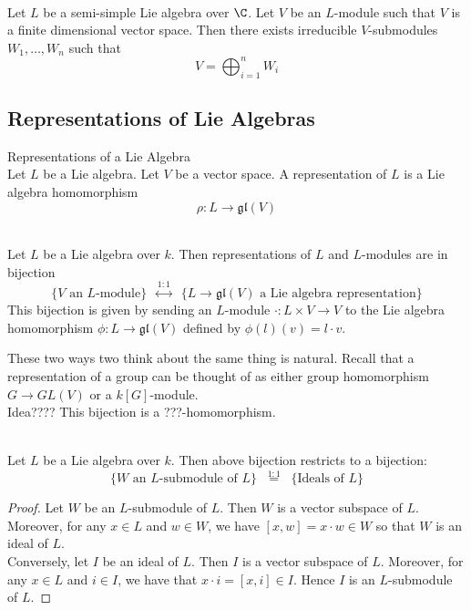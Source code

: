 \documentclass[a4paper]{article}
\begin{document}
\begin{crl}{}{} \\Let $L$ be a semi-simple Lie algebra over $\C$. Let $V$ be an $L$-module such that $V$ is a finite dimensional vector space. Then there exists irreducible $V$-submodules $W_1,\dots,W_n$ such that $$V=\bigoplus_{i=1}^nW_i$$
\end{crl}

\subsection{Representations of Lie Algebras}
\begin{defn}{Representations of a Lie Algebra}{} \\Let $L$ be a Lie algebra. Let $V$ be a vector space. A representation of $L$ is a Lie algebra homomorphism $$\rho:L\to\mathfrak{gl}(V)$$
\end{defn}

\begin{prp}{}{} \\Let $L$ be a Lie algebra over $k$. Then representations of $L$ and $L$-modules are in bijection $$\{V\text{ an }L\text{-module}\}\;\;\overset{1:1}{\leftrightarrow}\;\;\{L\to\mathfrak{gl}(V)\text{ a Lie algebra representation}\}$$ This bijection is given by sending an $L$-module $\cdot:L\times V\to V$ to the Lie algebra homomorphism $\phi:L\to\mathfrak{gl}(V)$ defined by $\phi(l)(v)=l\cdot v$. 
\end{prp}

These two ways two think about the same thing is natural. Recall that a representation of a group can be thought of as either group homomorphism $G\to GL(V)$ or a $k[G]$-module. \\

Idea???? This bijection is a ???-homomorphism. 

\begin{lmm}{}{} \\Let $L$ be a Lie algebra over $k$. Then above bijection restricts to a bijection: $$\{W\text{ an }L\text{-submodule of }L\}\;\;\overset{1:1}{=}\;\;\{\text{Ideals of }L\}$$ 
\begin{proof}
Let $W$ be an $L$-submodule of $L$. Then $W$ is a vector subspace of $L$. Moreover, for any $x\in L$ and $w\in W$, we have $[x,w]=x\cdot w\in W$ so that $W$ is an ideal of $L$. \\

Conversely, let $I$ be an ideal of $L$. Then $I$ is a vector subspace of $L$. Moreover, for any $x\in L$ and $i\in I$, we have that $x\cdot i=[x,i]\in I$. Hence $I$ is an $L$-submodule of $L$. 
\end{proof}
\end{lmm}
\end{document}
